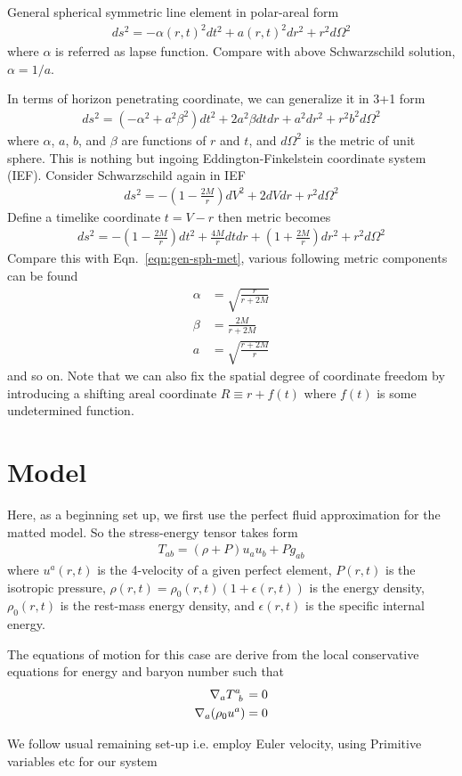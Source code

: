 \documentclass[prd]{revtex4}
\begin{document}
General spherical symmetric line element in polar-areal form
\begin{align}
\label{eqn:ss-met-pa}
ds^2 = - \alpha(r,t)^2 dt^2 + a(r,t)^2 dr^2 + r^2 d \Omega^2
\end{align}
where $\alpha$ is referred as lapse function. Compare with above Schwarzschild solution, $\alpha = 1/a$. 

In terms of horizon penetrating coordinate, we can generalize it in 3+1 form
\begin{align}
\label{eqn:gen-sph-met}
ds^2 = (-\alpha^2 + a^2 \beta^2) dt^2 + 2a^2 \beta dt dr + a^2 dr^2 + r^2 b^2 d \Omega^2
\end{align}
where $\alpha$, $a$, $b$, and $\beta$ are functions of $r$ and $t$, and $d\Omega^2$ is the metric of unit sphere. This is nothing but ingoing Eddington-Finkelstein coordinate system (IEF). Consider Schwarzschild again in IEF
\begin{align}
ds^2 = - \left( 1- \frac{2M}{r} \right) dV^2 + 2 dV dr + r^2 d \Omega^2
\end{align}
Define a timelike coordinate $t = V-r$ then metric becomes
\begin{align}
ds^2 = - \left( 1- \frac{2M}{r} \right) dt^2 + \frac{4M}{r} dt dr +  \left( 1+ \frac{2M}{r} \right) dr^2 + r^2 d \Omega^2
\end{align}
Compare this with Eqn.~\ref{eqn:gen-sph-met}, various following metric components can be found
\begin{align}
\alpha &= \sqrt{\frac{r}{r+2M}} \\
\beta &=\frac{2M}{r+2M} \\
a &=\sqrt{\frac{r+2M}{r}}
\end{align}
and so on. Note that we can also fix the spatial degree of coordinate freedom by introducing a shifting areal coordinate $R \equiv  r + f(t)$ where $f(t)$ is some undetermined function.  

\section{Model}

Here, as a beginning set up, we first use the perfect fluid approximation for the matted model. So the stress-energy tensor takes form
\begin{align}
\label{eqn:EMtPF}
T_{ab} = (\rho + P) u_a u_b +P g_{ab} 
\end{align}
where $u^a(r,t)$ is the 4-velocity of a given perfect element, $P(r,t)$ is the isotropic pressure, $\rho(r,t) = \rho_0(r,t) (1+\epsilon(r,t))$ is the energy density, $\rho_0 (r,t)$ is the rest-mass energy density, and $\epsilon(r,t)$ is the specific internal energy.

The equations of motion for this case are derive from the local conservative equations for energy and baryon number such that
\begin{align}
\nabla_a T\indices{^a_b} &= 0 \\
\nabla_a (\rho_0 u^a) &= 0 
\end{align}

We follow usual remaining set-up i.e. employ Euler velocity, using Primitive variables etc for our system
\end{document}
